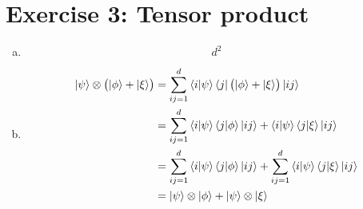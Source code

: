 \documentclass[a4paper,german,12pt,smallheadings]{scrartcl}
\begin{document}
\section*{Exercise 3: Tensor product}
\begin{enumerate}[a)]
  \item
    \begin{equation*}
      d^2
    \end{equation*}
  \item
    \begin{align*}
      \ket{\psi} \otimes \del{\ket{\phi} + \ket{\xi}} &= \sum_{ij=1}^d \braket{i|\psi} \bra{j} \del{\ket\phi + \ket\xi} \ket{ij} \\
      &= \sum_{ij=1}^d \braket{i|\psi} \braket{j|\phi}\ket{ij} + \braket{i|\psi} \braket{j|\xi} \ket{ij} \\
      &= \sum_{ij=1}^d \braket{i|\psi} \braket{j|\phi}\ket{ij} + \sum_{ij=1}^d \braket{i|\psi} \braket{j|\xi} \ket{ij} \\
      &= \ket\psi \otimes \ket\phi + \ket\psi \otimes \ket\xi
    \end{align*}
\end{enumerate}
\end{document}
